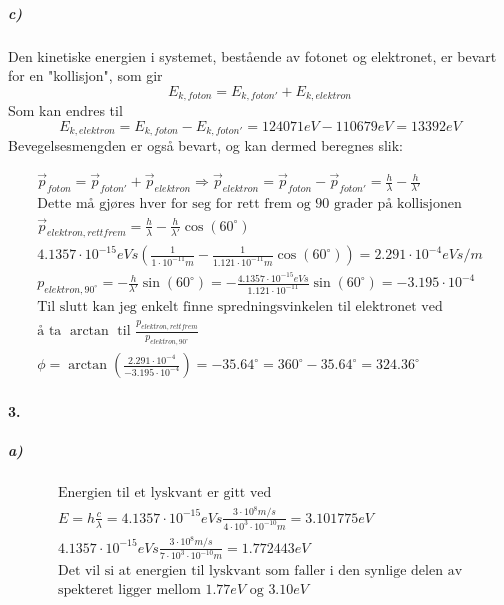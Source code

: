\documentclass[11pt, A4paper,norsk]{article}
\begin{document}
			\subparagraph{c)}
				\begin{flushleft}
Den kinetiske energien i systemet, bestående av fotonet og elektronet, er bevart for en "kollisjon", som gir $$E_{k, foton} = E_{k, foton'} + E_{k, elektron} $$ Som kan endres til $$E_{k, elektron} = E_{k, foton} - E_{k, foton'} = 124071 eV - 110679 eV = 13392 eV$$ Bevegelsesmengden er også bevart, og kan dermed beregnes slik: 
				\end{flushleft}
				\begin{gather*}
\vec{p}_{foton} = \vec{p}_{foton'} + \vec{p}_{elektron} \Rightarrow \vec{p}_{elektron} = \vec{p}_{foton} - \vec{p}_{foton'} = \frac{h}{\lambda} - \frac{h}{\lambda'} \\
\text{Dette må gjøres hver for seg for rett frem og $90$ grader på kollisjonen} \\
\vec{p}_{elektron, rett frem} = \frac{h}{\lambda} - \frac{h}{\lambda'} \cos(60^{\circ}) \\
4.1357 \cdot 10^{-15} eVs \left( \frac{1}{1 \cdot 10^{-11} m} - \frac{1}{1.121 \cdot 10^{-11} m} \cos(60^{\circ}) \right) = 2.291 \cdot 10^{-4} eVs/m \\
p_{elektron, 90^{\circ}} = - \frac{h}{\lambda'}\sin(60^{\circ}) = - \frac{4.1357 \cdot 10^{-15} eVs}{1.121 \cdot 10^{-11}}\sin(60^{\circ}) = -3.195 \cdot 10^{-4} \\
\text{Til slutt kan jeg enkelt finne spredningsvinkelen til elektronet ved} \\
\text{å ta $\arctan$ til $\frac{p_{elektron, rett frem}}{p_{elektron, 90^{\circ}}}$} \\
\phi = \arctan \left( \frac{2.291 \cdot 10^{-4}}{-3.195 \cdot 10^{-4}} \right) = -35.64^{\circ} = 360^{\circ} - 35.64^{\circ} = 324.36^{\circ}
				\end{gather*}
				












		\paragraph{3.}
			\subparagraph{a)}
				\begin{gather*}
\text{Energien til et lyskvant er gitt ved} \\
E = h \frac{c}{\lambda} = 4.1357 \cdot 10^{-15} eVs \frac{3 \cdot 10^{8} m/s}{4 \cdot 10^3 \cdot 10^{-10} m} = 3.101775 eV \\
4.1357 \cdot 10^{-15} eVs \frac{3 \cdot 10^{8} m/s}{7 \cdot 10^3 \cdot 10^{-10} m} = 1.772443 eV \\
\text{Det vil si at energien til lyskvant som faller i den synlige delen av} \\
\text{spekteret ligger mellom $1.77eV$ og $3.10eV$}
				\end{gather*}
\end{document}
